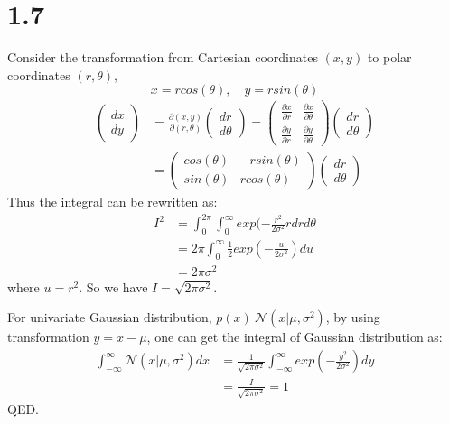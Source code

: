 \documentclass[10pt,a4paper,draft]{book}
\begin{document}
\section*{1.7}
Consider the transformation from Cartesian coordinates $(x,y)$ to polar coordinates $(r,\theta)$, 
\begin{equation}
x = r cos(\theta), \quad y = r sin(\theta)
\end{equation}
\begin{equation}
\begin{aligned}
\begin{pmatrix}
dx \\
dy
\end{pmatrix} &=
\frac{\partial(x,y)}{\partial(r,\theta)}
\begin{pmatrix}
dr \\
d\theta
\end{pmatrix} = 
\begin{pmatrix}
\frac{\partial x}{\partial r} & \frac{\partial x}{\partial \theta} \\
\frac{\partial y}{\partial r} & \frac{\partial y}{\partial \theta} 
\end{pmatrix} 
\begin{pmatrix}
dr \\
d\theta
\end{pmatrix} \\
&=
\begin{pmatrix}
cos(\theta) & -r sin(\theta) \\
sin(\theta) & r cos(\theta) 
\end{pmatrix} 
\begin{pmatrix}
dr \\
d\theta
\end{pmatrix}
\end{aligned}
\end{equation}
Thus the integral can be rewritten as:
\begin{equation}
\begin{aligned}
I^2 &=  \int_0^{2\pi} \int_0^{\infty} exp(-\frac{r^2}{2\sigma^2}r dr d\theta \\
&= 2\pi\int_0^{\infty} \frac{1}{2}exp(-\frac{u}{2\sigma^2})du \\
&= 2\pi\sigma^2
\end{aligned}
\end{equation}
where $u=r^2$. So we have $I = \sqrt{2\pi\sigma^2}$.

For univariate Gaussian distribution, $p(x) ~ \mathcal{N}(x|\mu,\sigma^2)$, by using transformation $y = x - \mu$, one can get the integral of Gaussian distribution as:
\begin{equation}
\begin{aligned}
\int_{-\infty}^{\infty}\mathcal{N}(x|\mu,\sigma^2) dx &= \frac{1}{\sqrt{2\pi\sigma^2}} \int_{-\infty}^{\infty} exp(-\frac{y^2}{2\sigma^2}) dy \\
&= \frac{I}{\sqrt{2\pi\sigma^2}} = 1
\end{aligned}
\end{equation}
QED.
\end{document}
